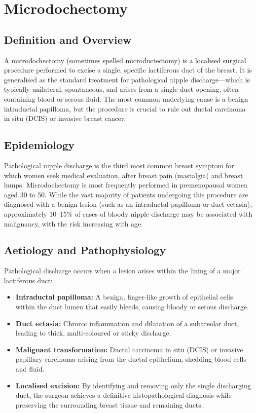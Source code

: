 \chapter{Microdochectomy}

\section*{Definition and Overview}
A microdochectomy (sometimes spelled microductectomy) is a localised surgical procedure performed to excise a single, specific lactiferous duct of the breast. It is generalised as the standard treatment for pathological nipple discharge---which is typically unilateral, spontaneous, and arises from a single duct opening, often containing blood or serous fluid. The most common underlying cause is a benign intraductal papilloma, but the procedure is crucial to rule out ductal carcinoma in situ (DCIS) or invasive breast cancer.

\section*{Epidemiology}
Pathological nipple discharge is the third most common breast symptom for which women seek medical evaluation, after breast pain (mastalgia) and breast lumps. Microdochectomy is most frequently performed in premenopausal women aged 30 to 50. While the vast majority of patients undergoing this procedure are diagnosed with a benign lesion (such as an intraductal papilloma or duct ectasia), approximately 10--15\% of cases of bloody nipple discharge may be associated with malignancy, with the risk increasing with age.

\section*{Aetiology and Pathophysiology}
Pathological discharge occurs when a lesion arises within the lining of a major lactiferous duct:

\begin{itemize}
    \item \textbf{Intraductal papilloma:} A benign, finger-like growth of epithelial cells within the duct lumen that easily bleeds, causing bloody or serous discharge.
    \item \textbf{Duct ectasia:} Chronic inflammation and dilatation of a subareolar duct, leading to thick, multi-coloured or sticky discharge.
    \item \textbf{Malignant transformation:} Ductal carcinoma in situ (DCIS) or invasive papillary carcinoma arising from the ductal epithelium, shedding blood cells and fluid.
    \item \textbf{Localised excision:} By identifying and removing only the single discharging duct, the surgeon achieves a definitive histopathological diagnosis while preserving the surrounding breast tissue and remaining ducts.
\end{itemize}

